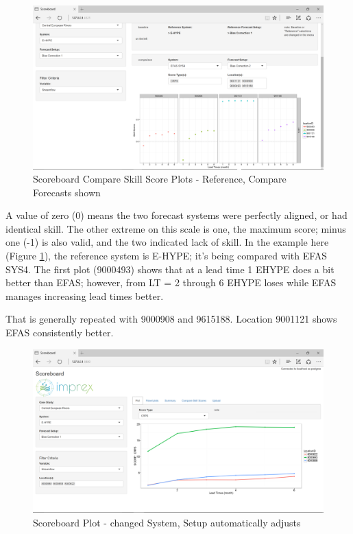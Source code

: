 \documentclass[logos,parttoc,morelanguage=french,morelanguage=german]{orsay-memoire}
\begin{document}
\begin{figure}[H]
\centering
\includegraphics[width=0.9\linewidth]{images/isb5_2.png}
  \caption{Scoreboard Compare Skill Score Plots - Reference, Compare Forecasts shown}
  \label{fig:isb5_2}
\end{figure}

A value of zero (0) means the two forecast systems were perfectly aligned, or had identical skill. The other extreme on this scale is one, the maximum score; minus one (-1) is also valid, and the two indicated lack of skill. In the example here (Figure \ref{fig:isb5_2}), the reference system is E-HYPE; it's being compared with EFAS SYS4. The first plot (9000493) shows that at a lead time 1 EHYPE does a bit better than EFAS; however, from LT = 2 through 6 EHYPE loses while EFAS manages increasing lead times better.

That is generally repeated with 9000908 and 9615188. Location 9001121 shows EFAS consistently better.


\begin{figure}[h]
\centering
\includegraphics[width=0.90\linewidth]{images/isb6.png}
  \caption{Scoreboard Plot - changed System, Setup automatically adjusts}
  \label{fig:isb6}
\end{figure}
\end{document}
